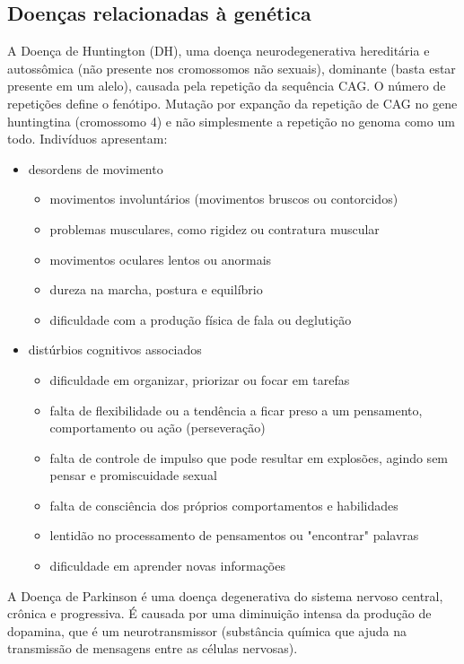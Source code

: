 \documentclass[
	article,			%
	12pt,				%
	oneside,			%
	a4paper,			%
	english,			%
	brazil,				%
	sumario=tradicional
	]{abntex2}
\begin{document}
\subsection{Doenças relacionadas à genética}
A Doença de Huntington (DH), uma doença neurodegenerativa hereditária e autossômica (não presente nos cromossomos não sexuais), dominante (basta estar presente em um alelo), causada pela repetição da sequência CAG. O número de repetições define o fenótipo. Mutação por expanção da repetição de CAG no gene huntingtina (cromossomo 4) e não simplesmente a repetição no genoma como um todo.
Indivíduos apresentam:
\begin{itemize}
    \item desordens de movimento
    	\begin{itemize}
			\item  movimentos involuntários (movimentos bruscos ou contorcidos)
			\item  problemas musculares, como rigidez ou contratura muscular
			\item  movimentos oculares lentos ou anormais
			\item  dureza na marcha, postura e equilíbrio
			\item  dificuldade com a produção física de fala ou deglutição
    	\end{itemize}
    
    \item distúrbios cognitivos associados
        \begin{itemize}
			\item dificuldade em organizar, priorizar ou focar em tarefas
			\item falta de flexibilidade ou a tendência a ficar preso a um pensamento, comportamento ou ação (perseveração) 
			\item falta de controle de impulso que pode resultar em explosões, agindo sem pensar e promiscuidade sexual
			\item falta de consciência dos próprios comportamentos e habilidades
			\item lentidão no processamento de pensamentos ou "encontrar" palavras
			\item dificuldade em aprender novas informações
    	\end{itemize}
		     
    
    
\end{itemize}



A Doença de Parkinson é uma doença degenerativa do sistema nervoso central, crônica e progressiva. É causada por uma diminuição intensa da produção de dopamina, que é um neurotransmissor (substância química que ajuda na transmissão de mensagens entre as células nervosas). 
\end{document}
